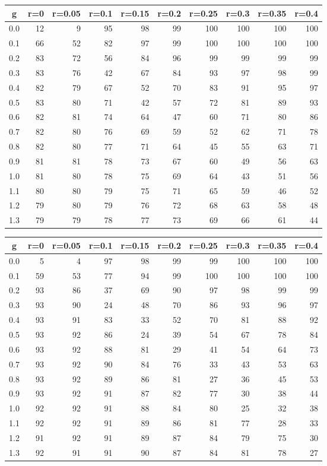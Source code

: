 %
\begin{table}[!tbp]
 \begin{center}
 \begin{tabular}{rrrrrrrrrr}\hline\hline
\multicolumn{1}{c}{g}&\multicolumn{1}{c}{r=0}&\multicolumn{1}{c}{r=0.05}&\multicolumn{1}{c}{r=0.1}&\multicolumn{1}{c}{r=0.15}&\multicolumn{1}{c}{r=0.2}&\multicolumn{1}{c}{r=0.25}&\multicolumn{1}{c}{r=0.3}&\multicolumn{1}{c}{r=0.35}&\multicolumn{1}{c}{r=0.4}\tabularnewline
\hline
0.0&12& 9&95&98&99&100&100&100&100\tabularnewline
0.1&66&52&82&97&99&100&100&100&100\tabularnewline
0.2&83&72&56&84&96& 99& 99& 99& 99\tabularnewline
0.3&83&76&42&67&84& 93& 97& 98& 99\tabularnewline
0.4&82&79&67&52&70& 83& 91& 95& 97\tabularnewline
0.5&83&80&71&42&57& 72& 81& 89& 93\tabularnewline
0.6&82&81&74&64&47& 60& 71& 80& 86\tabularnewline
0.7&82&80&76&69&59& 52& 62& 71& 78\tabularnewline
0.8&82&80&77&71&64& 45& 55& 63& 71\tabularnewline
0.9&81&81&78&73&67& 60& 49& 56& 63\tabularnewline
1.0&81&80&78&75&69& 64& 43& 51& 56\tabularnewline
1.1&80&80&79&75&71& 65& 59& 46& 52\tabularnewline
1.2&79&80&79&76&72& 68& 63& 58& 48\tabularnewline
1.3&79&79&78&77&73& 69& 66& 61& 44\tabularnewline
\hline
\end{tabular}

\end{center}

\end{table}

%
\begin{table}[!tbp]
 \begin{center}
 \begin{tabular}{rrrrrrrrrr}\hline\hline
\multicolumn{1}{c}{g}&\multicolumn{1}{c}{r=0}&\multicolumn{1}{c}{r=0.05}&\multicolumn{1}{c}{r=0.1}&\multicolumn{1}{c}{r=0.15}&\multicolumn{1}{c}{r=0.2}&\multicolumn{1}{c}{r=0.25}&\multicolumn{1}{c}{r=0.3}&\multicolumn{1}{c}{r=0.35}&\multicolumn{1}{c}{r=0.4}\tabularnewline
\hline
0.0& 5& 4&97&98&99& 99&100&100&100\tabularnewline
0.1&59&53&77&94&99&100&100&100&100\tabularnewline
0.2&93&86&37&69&90& 97& 98& 99& 99\tabularnewline
0.3&93&90&24&48&70& 86& 93& 96& 97\tabularnewline
0.4&93&91&83&33&52& 70& 81& 88& 92\tabularnewline
0.5&93&92&86&24&39& 54& 67& 78& 84\tabularnewline
0.6&93&92&88&81&29& 41& 54& 64& 73\tabularnewline
0.7&93&92&90&84&76& 33& 43& 53& 63\tabularnewline
0.8&93&92&89&86&81& 27& 36& 45& 53\tabularnewline
0.9&93&92&91&87&82& 77& 30& 38& 44\tabularnewline
1.0&92&92&91&88&84& 80& 25& 32& 38\tabularnewline
1.1&92&92&91&89&86& 81& 77& 28& 33\tabularnewline
1.2&91&92&91&89&87& 84& 79& 75& 30\tabularnewline
1.3&92&91&91&90&87& 84& 81& 78& 27\tabularnewline
\hline
\end{tabular}

\end{center}

\end{table}

